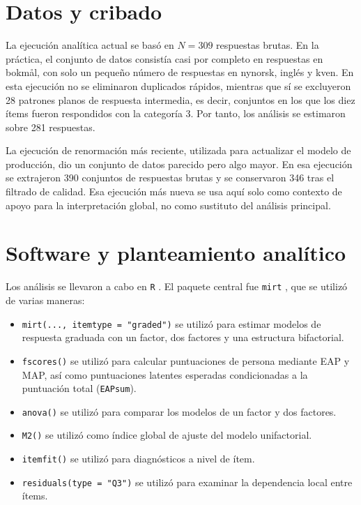 \documentclass[11pt,a4paper]{article}
\begin{document}
\section{Datos y cribado}
La ejecución analítica actual se basó en $N = 309$ respuestas brutas. En la práctica, el conjunto de datos consistía casi por completo en respuestas en bokmål, con solo un pequeño número de respuestas en nynorsk, inglés y kven. En esta ejecución no se eliminaron duplicados rápidos, mientras que sí se excluyeron 28 patrones planos de respuesta intermedia, es decir, conjuntos en los que los diez ítems fueron respondidos con la categoría 3. Por tanto, los análisis se estimaron sobre 281 respuestas.

La ejecución de renormación más reciente, utilizada para actualizar el modelo de producción, dio un conjunto de datos parecido pero algo mayor. En esa ejecución se extrajeron 390 conjuntos de respuestas brutas y se conservaron 346 tras el filtrado de calidad. Esa ejecución más nueva se usa aquí solo como contexto de apoyo para la interpretación global, no como sustituto del análisis principal.

\section{Software y planteamiento analítico}
Los análisis se llevaron a cabo en \texttt{R} \parencite{RCore2026}. El paquete central fue \texttt{mirt} \parencite{Chalmers2012mirt}, que se utilizó de varias maneras:

\begin{itemize}
\item \texttt{mirt(..., itemtype = "graded")} se utilizó para estimar modelos de respuesta graduada con un factor, dos factores y una estructura bifactorial.
\item \texttt{fscores()} se utilizó para calcular puntuaciones de persona mediante EAP y MAP, así como puntuaciones latentes esperadas condicionadas a la puntuación total (\texttt{EAPsum}).
\item \texttt{anova()} se utilizó para comparar los modelos de un factor y dos factores.
\item \texttt{M2()} se utilizó como índice global de ajuste del modelo unifactorial.
\item \texttt{itemfit()} se utilizó para diagnósticos a nivel de ítem.
\item \texttt{residuals(type = "Q3")} se utilizó para examinar la dependencia local entre ítems.
\end{itemize}
\end{document}
